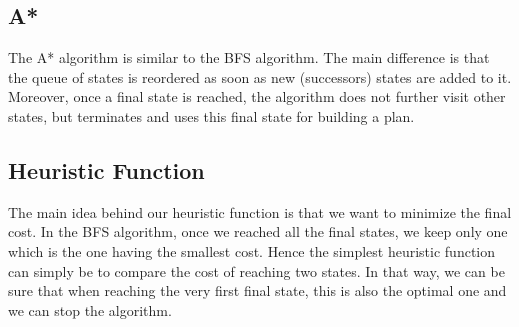 \documentclass[10pt]{article}
\begin{document}
%



\subsection{A*}
The A* algorithm is similar to the BFS algorithm. The main difference is that the queue of states is reordered as soon as new (successors) states are added to it. Moreover, once a final state is reached, the algorithm does not further visit other states, but terminates and uses this final state for building a plan.

\subsection{Heuristic Function}
The main idea behind our heuristic function is that we want to minimize the final cost. In the BFS algorithm, once we reached all the final states, we keep only one which is the one having the smallest cost. Hence the simplest heuristic function can simply be to compare the cost of reaching two states. In that way, we can be sure that when reaching the very first final state, this is also the optimal one and we can stop the algorithm.
\end{document}

